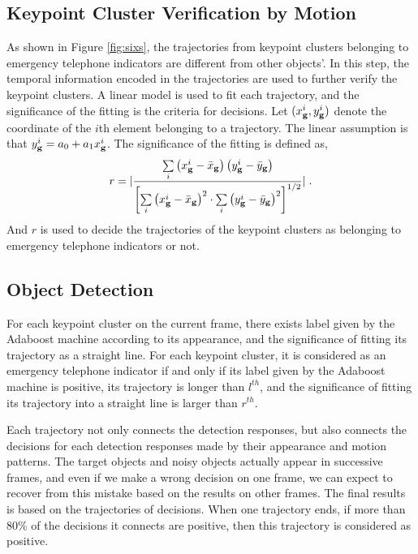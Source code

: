 \subsection{Keypoint Cluster Verification by Motion}
As shown in Figure \ref{fig:sixs}, the trajectories from keypoint clusters belonging to emergency telephone indicators are different from other objects'. In this step, the temporal information encoded in the trajectories are used to further verify the keypoint clusters. A linear model is used to fit each trajectory, and the significance of the fitting is the criteria for decisions. Let $(x^i_{\bf{g}},y^i_{\bf{g}})$ denote the coordinate of the $i$th element belonging to a trajectory. The linear assumption is that $y^i_{\bf{g}}=a_0+a_1{x^i_{\bf{g}}}$. The significance of the fitting is defined as,
\begin{equation}
r =| \frac{{\sum\limits_i {\left( {{x^i_{\bf{g}}} -  {\bar x_{\bf{g}}}} \right)\left( {{y^i_{\bf{g}}} -  {\bar y_{\bf{g}}}} \right)} }}{{{{\left[ {\sum\limits_i {{{\left( {{x^i_{\bf{g}}} -  {\bar x_{\bf{g}}}} \right)}^2} \cdot \sum\limits_i {{{\left( {{y^i_{\bf{g}}} -  {\bar y_{\bf{g}}}} \right)}^2}} } } \right]}^{1/2}}}}|\;.
\label{eq4}
\end{equation}
And $r$ is used to decide the trajectories of the keypoint clusters as belonging to emergency telephone indicators or not.
\subsection{Object Detection}
For each keypoint cluster on the current frame, there exists label given by the Adaboost machine according to its appearance, and the significance of fitting its trajectory as a straight line.  For each keypoint cluster, it is considered as an emergency telephone indicator if and only if its label given by the Adaboost machine is positive, its trajectory is longer than $l^{th}$, and the significance of fitting its trajectory into a straight line is larger than $r^{th}$.

Each trajectory not only connects the detection responses, but also connects the decisions for each detection responses made by their appearance and motion patterns. The target objects and noisy objects actually appear in successive frames, and even if we make a wrong decision on one frame, we can expect to recover from this mistake based on the results on other frames. The final results is based on the trajectories of decisions. When one trajectory ends, if more than 80\% of the decisions it connects are positive, then this trajectory is considered as positive.




